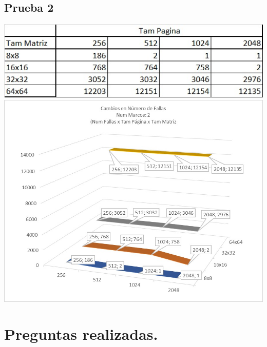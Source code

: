 \documentclass[a4paper]{article}
\begin{document}
\subsection{Prueba 2}
\includegraphics{2-1.jpeg}
\includegraphics[scale=0.55]{2-2.jpeg}


\section{Preguntas realizadas.}
\end{document}
